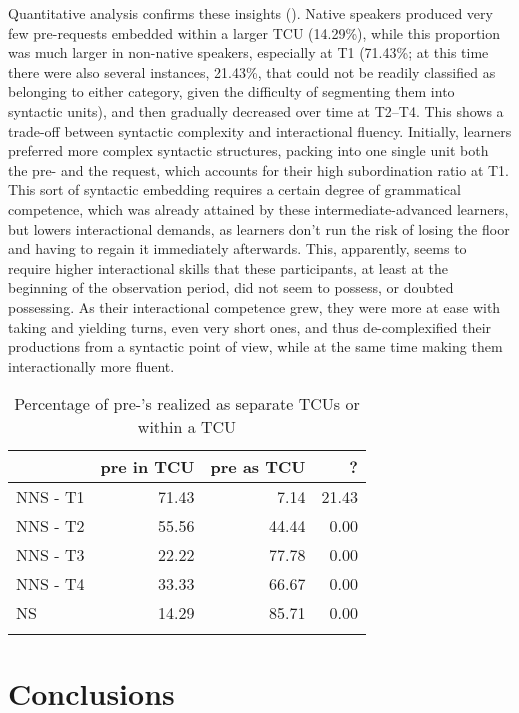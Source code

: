 \documentclass[output=paper]{langscibook}
\begin{document}
Quantitative analysis confirms these insights (). Native speakers produced very few pre-requests embedded within a larger TCU (14.29\%), while this proportion was much larger in non-native speakers, especially at T1 (71.43\%; at this time there were also several instances, 21.43\%, that could not be readily classified as belonging to either category, given the difficulty of segmenting them into syntactic units), and then gradually decreased over time at T2--T4. This shows a trade-off between syntactic complexity and interactional fluency. Initially, learners preferred more complex syntactic structures, packing into one single unit both the pre- and the request, which accounts for their high subordination ratio at T1. This sort of syntactic embedding requires a certain degree of grammatical competence, which was already attained by these intermediate-advanced learners, but lowers interactional demands, as learners don’t run the risk of losing the floor and having to regain it immediately afterwards. This, apparently, seems to require higher interactional skills that these participants, at least at the beginning of the observation period, did not seem to possess, or doubted possessing. As their interactional competence grew, they were more at ease with taking and yielding turns, even very short ones, and thus de-complexified their productions from a syntactic point of view, while at the same time making them interactionally more fluent.

\begin{table}
\begin{tabular}{lrrr} 
\lsptoprule
& {pre in TCU} & {pre as TCU} & {?}\\
\midrule
NNS - T1 & 71.43 &  7.14 & 21.43\\
NNS - T2 & 55.56 & 44.44 &  0.00\\
NNS - T3 & 22.22 & 77.78 &  0.00\\
NNS - T4 & 33.33 & 66.67 &  0.00\\
NS       & 14.29 & 85.71 &  0.00\\
\lspbottomrule
\end{tabular}
\caption{Percentage of pre-’s realized as separate TCUs or within a TCU}
\label{tab:pallotti:5}
\end{table}

\section{Conclusions}\label{sec:pallotti:5}
\end{document}
